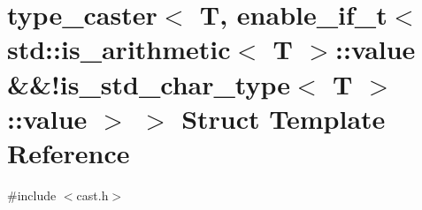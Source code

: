 \hypertarget{structtype__caster_3_01_t_00_01enable__if__t_3_01std_1_1is__arithmetic_3_01_t_01_4_1_1value_01_624f9972c532456d927e4470192416960}{}\section{type\+\_\+caster$<$ T, enable\+\_\+if\+\_\+t$<$ std\+::is\+\_\+arithmetic$<$ T $>$\+::value \&\&!is\+\_\+std\+\_\+char\+\_\+type$<$ T $>$\+::value $>$ $>$ Struct Template Reference}
\label{structtype__caster_3_01_t_00_01enable__if__t_3_01std_1_1is__arithmetic_3_01_t_01_4_1_1value_01_624f9972c532456d927e4470192416960}


{\ttfamily \#include $<$cast.\+h$>$}

